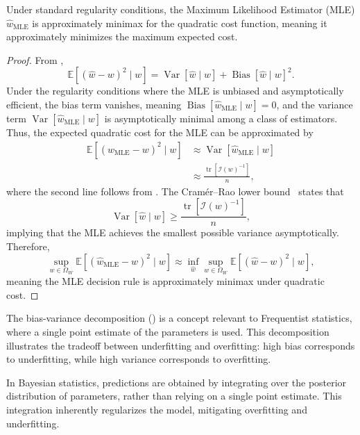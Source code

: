 \begin{corollary}
	\label{cor:MLE_minimax}
	Under standard regularity conditions, the Maximum Likelihood Estimator (MLE) $\hat{w}_{\text{MLE}}$ is approximately minimax for the quadratic cost function, meaning it approximately minimizes the maximum expected cost.
	\begin{proof}
		From ,
		\begin{equation}
			\mathbb{E}[(\hat{w}-w)^2\mid w] = \operatorname{Var}[\hat{w}\mid w] + \operatorname{Bias}[\hat{w}\mid w]^2.
		\end{equation}
		Under the regularity conditions where the MLE is unbiased and asymptotically efficient, the bias term vanishes, meaning $\operatorname{Bias}[\hat{w}_{\text{MLE}}\mid w] = 0$, and the variance term $\operatorname{Var}[\hat{w}_{\text{MLE}}\mid w]$ is asymptotically minimal among a class of estimators.  
		Thus, the expected quadratic cost for the MLE can be approximated by
		\begin{equation}
			\begin{split}
				\mathbb{E}[(\hat{w}_{\text{MLE}} - w)^2\mid w] &\approx \operatorname{Var}[\hat{w}_{\text{MLE}}\mid w] \\
				&\approx \frac{\operatorname{tr}[\mathcal{I}(w)^{-1}]}{n},
			\end{split}
		\end{equation}
		where the second line follows from .  
		The Cramér–Rao lower bound~\citep{Rao1973Linear} states that
		\begin{equation}
			\operatorname{Var}[\hat{w}\mid w] \geq \frac{\operatorname{tr}[\mathcal{I}(w)^{-1}]}{n},
		\end{equation}
		implying that the MLE achieves the smallest possible variance asymptotically. Therefore,
		\begin{equation}
			\sup_{w \in \Omega_W} \mathbb{E}[(\hat{w}_{\text{MLE}} - w)^2 \mid w]
			\approx \inf_{\hat{w}} \sup_{w \in \Omega_W} \mathbb{E}[(\hat{w} - w)^2 \mid w],
		\end{equation}
		meaning the MLE decision rule is approximately minimax under quadratic cost.
	\end{proof}
\end{corollary}

\begin{remark}
	The bias-variance decomposition () is a concept relevant to Frequentist statistics, where a single point estimate of the parameters is used. This decomposition illustrates the tradeoff between underfitting and overfitting: high bias corresponds to underfitting, while high variance corresponds to overfitting. \newline
	
	In Bayesian statistics, predictions are obtained by integrating over the posterior distribution of parameters, rather than relying on a single point estimate. This integration inherently regularizes the model, mitigating overfitting and underfitting.
\end{remark}

